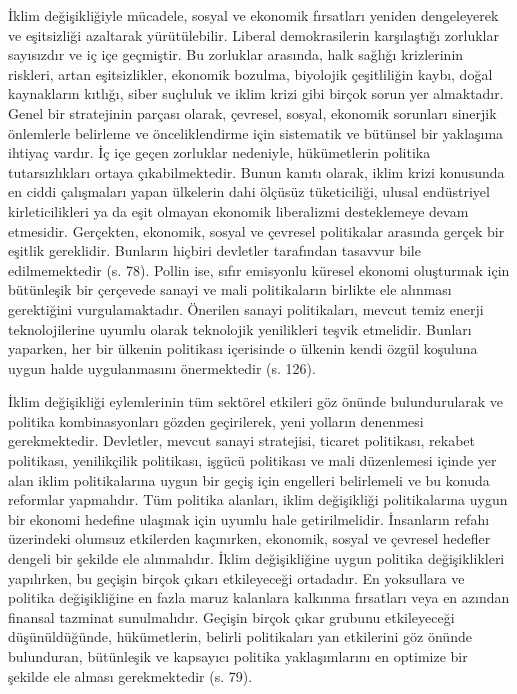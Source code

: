 \documentclass[
]{book}
\begin{document}
İklim değişikliğiyle mücadele, sosyal ve ekonomik fırsatları yeniden dengeleyerek ve eşitsizliği azaltarak yürütülebilir. Liberal demokrasilerin karşılaştığı zorluklar sayısızdır ve iç içe geçmiştir. Bu zorluklar arasında, halk sağlığı krizlerinin riskleri, artan eşitsizlikler, ekonomik bozulma, biyolojik çeşitliliğin kaybı, doğal kaynakların kıtlığı, siber suçluluk ve iklim krizi gibi birçok sorun yer almaktadır. Genel bir stratejinin parçası olarak, çevresel, sosyal, ekonomik sorunları sinerjik önlemlerle belirleme ve önceliklendirme için sistematik ve bütünsel bir yaklaşıma ihtiyaç vardır. İç içe geçen zorluklar nedeniyle, hükümetlerin politika tutarsızlıkları ortaya çıkabilmektedir. Bunun kanıtı olarak, iklim krizi konusunda en ciddi çalışmaları yapan ülkelerin dahi ölçüsüz tüketiciliği, ulusal endüstriyel kirleticilikleri ya da eşit olmayan ekonomik liberalizmi desteklemeye devam etmesidir. Gerçekten, ekonomik, sosyal ve çevresel politikalar arasında gerçek bir eşitlik gereklidir. Bunların hiçbiri devletler tarafından tasavvur bile edilmemektedir (s. 78). \citep{ponthieu2019climate} Pollin ise, sıfır emisyonlu küresel ekonomi oluşturmak için bütünleşik bir çerçevede sanayi ve mali politikaların birlikte ele alınması gerektiğini vurgulamaktadır. Önerilen sanayi politikaları, mevcut temiz enerji teknolojilerine uyumlu olarak teknolojik yenilikleri teşvik etmelidir. Bunları yaparken, her bir ülkenin politikası içerisinde o ülkenin kendi özgül koşuluna uygun halde uygulanmasını önermektedir (s. 126). \citep{chomsky2020}

İklim değişikliği eylemlerinin tüm sektörel etkileri göz önünde bulundurularak ve politika kombinasyonları gözden geçirilerek, yeni yolların denenmesi gerekmektedir. Devletler, mevcut sanayi stratejisi, ticaret politikası, rekabet politikası, yenilikçilik politikası, işgücü politikası ve mali düzenlemesi içinde yer alan iklim politikalarına uygun bir geçiş için engelleri belirlemeli ve bu konuda reformlar yapmalıdır. Tüm politika alanları, iklim değişikliği politikalarına uygun bir ekonomi hedefine ulaşmak için uyumlu hale getirilmelidir. İnsanların refahı üzerindeki olumsuz etkilerden kaçınırken, ekonomik, sosyal ve çevresel hedefler dengeli bir şekilde ele alınmalıdır. İklim değişikliğine uygun politika değişiklikleri yapılırken, bu geçişin birçok çıkarı etkileyeceği ortadadır. En yoksullara ve politika değişikliğine en fazla maruz kalanlara kalkınma fırsatları veya en azından finansal tazminat sunulmalıdır. Geçişin birçok çıkar grubunu etkileyeceği düşünüldüğünde, hükümetlerin, belirli politikaları yan etkilerini göz önünde bulunduran, bütünleşik ve kapsayıcı politika yaklaşımlarını en optimize bir şekilde ele alması gerekmektedir (s. 79).\citep{ponthieu2019climate}
\end{document}
